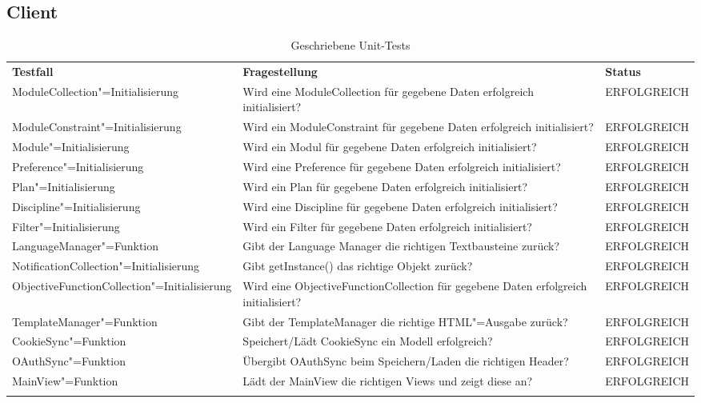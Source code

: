 \FloatBarrier
\subsection{Client}

\begin{longtable}{| >{\hspace{0pt}} p{} | >{\hspace{0pt}} p{} | >{\hspace{0pt}} p{} |}
	\hline
	\textbf{Testfall} & \textbf{Fragestellung} & \textbf{Status} \\ 
	\hhline{|=|=|=|}  
	\endfirsthead
	\endhead
	
	ModuleCollection"=Initialisierung & Wird eine ModuleCollection für gegebene Daten erfolgreich initialisiert?  & ERFOLGREICH \\ \hline
	ModuleConstraint"=Initialisierung & Wird ein ModuleConstraint für gegebene Daten erfolgreich initialisiert? & ERFOLGREICH \\ \hline
	Module"=Initialisierung & Wird ein Modul für gegebene Daten erfolgreich initialisiert? & ERFOLGREICH \\ \hline
	Preference"=Initialisierung & Wird eine Preference für gegebene Daten erfolgreich initialisiert? & ERFOLGREICH \\ \hline
	Plan"=Initialisierung & Wird ein Plan für gegebene Daten erfolgreich initialisiert? & ERFOLGREICH \\ \hline
	Discipline"=Initialisierung & Wird eine Discipline für gegebene Daten erfolgreich initialisiert? & ERFOLGREICH \\ \hline
	Filter"=Initialisierung & Wird ein Filter für gegebene Daten erfolgreich initialisiert? & ERFOLGREICH \\ \hline
	LanguageManager"=Funktion & Gibt der Language Manager die richtigen Textbausteine zurück? & ERFOLGREICH \\ \hline
	NotificationCollection"=Initialisierung & Gibt getInstance() das richtige Objekt zurück? & ERFOLGREICH \\ \hline
	ObjectiveFunctionCollection"=Initialisierung & Wird eine ObjectiveFunctionCollection für gegebene Daten erfolgreich initialisiert? & ERFOLGREICH \\ \hline
	TemplateManager"=Funktion & Gibt der TemplateManager die richtige HTML"=Ausgabe zurück? & ERFOLGREICH \\ \hline
	CookieSync"=Funktion & Speichert/Lädt CookieSync ein Modell erfolgreich? & ERFOLGREICH \\ \hline
	OAuthSync"=Funktion & Übergibt OAuthSync beim Speichern/Laden die richtigen Header? & ERFOLGREICH \\ \hline
	MainView"=Funktion & Lädt der MainView die richtigen Views und zeigt diese an? & ERFOLGREICH \\	 
	\hhline{|=|=|=|}   
	\caption{Geschriebene Unit-Tests}
\end{longtable}